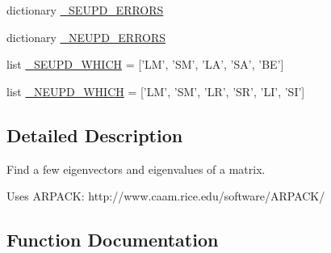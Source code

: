 \begin{DoxyCompactItemize}
\item 
dictionary \hyperlink{namespacescipy_1_1sparse_1_1linalg_1_1eigen_1_1arpack_1_1arpack_a332dcb29b5713ac6b13271bea8570994}{\+\_\+\+S\+E\+U\+P\+D\+\_\+\+E\+R\+R\+O\+R\+S}
\item 
dictionary \hyperlink{namespacescipy_1_1sparse_1_1linalg_1_1eigen_1_1arpack_1_1arpack_a4d1105b26a49e589a079ff1371df51d0}{\+\_\+\+N\+E\+U\+P\+D\+\_\+\+E\+R\+R\+O\+R\+S}
\item 
list \hyperlink{namespacescipy_1_1sparse_1_1linalg_1_1eigen_1_1arpack_1_1arpack_ad9de489dedaf53d4c6b49d3cc4f58c8c}{\+\_\+\+S\+E\+U\+P\+D\+\_\+\+W\+H\+I\+C\+H} = \mbox{[}'L\+M', 'S\+M', 'L\+A', 'S\+A', 'B\+E'\mbox{]}
\item 
list \hyperlink{namespacescipy_1_1sparse_1_1linalg_1_1eigen_1_1arpack_1_1arpack_a653ca60306118821f65ddbc63185809f}{\+\_\+\+N\+E\+U\+P\+D\+\_\+\+W\+H\+I\+C\+H} = \mbox{[}'L\+M', 'S\+M', 'L\+R', 'S\+R', 'L\+I', 'S\+I'\mbox{]}
\end{DoxyCompactItemize}


\subsection{Detailed Description}
\begin{DoxyVerb}Find a few eigenvectors and eigenvalues of a matrix.


Uses ARPACK: http://www.caam.rice.edu/software/ARPACK/\end{DoxyVerb}
 

\subsection{Function Documentation}
\hypertarget{namespacescipy_1_1sparse_1_1linalg_1_1eigen_1_1arpack_1_1arpack_a5a66e1e3ca3773a1cd1dca77ce5ccbed}{}
